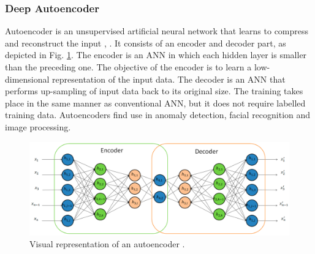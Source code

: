 \documentclass[conference, 11pt]{IEEEtran}
\begin{document}
    \subsubsection{Deep Autoencoder}
    Autoencoder is an unsupervised artificial neural network that learns to compress and reconstruct the input \cite{ballard1987modular}, \cite{rumelhart1985learning}.
    It consists of an encoder and decoder part, as depicted in Fig. \ref{fig:ae}.
    The encoder is an ANN in which each hidden layer is smaller than the preceding one.
    The objective of the encoder is to learn a low-dimensional representation of the input data.
    The decoder is an ANN that performs up-sampling of input data back to its original size.
    The training takes place in the same manner as conventional ANN, but it does not require labelled training data.
    Autoencoders find use in anomaly detection, facial recognition and image processing.

    \begin{figure}[htbp]
        \centerline{\includegraphics[width=\linewidth]{figures/ae.jpg}}
        \caption{Visual representation of an autoencoder \cite{article:18}.}
        \label{fig:ae}
    \end{figure}
\end{document}
